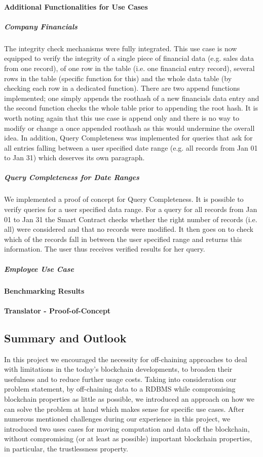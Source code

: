 \paragraph{Additional Functionalities for Use Cases}
\subparagraph{Company Financials}
The integrity check mechanisms were fully integrated. This use case is now equipped to verify the integrity of a single piece of financial data (e.g. sales data from one record), of one row in the table (i.e. one financial entry record), several rows in the table (specific function for this) and the whole data table (by checking each row in a dedicated function).
There are two append functions implemented; one simply appends the roothash of a new financials data entry and the second function checks the whole table prior to appending the root hash. It is worth noting again that this use case is append only and there is no way to modify or change a once appended roothash as this would undermine the overall idea.
In addition, Query Completeness was implemented for queries that ask for all entries falling between a user specified date range (e.g. all records from Jan 01 to Jan 31) which deserves its own paragraph.

\subparagraph{Query Completeness for Date Ranges}
We implemented a proof of concept for Query Completeness. It is possible to verify queries for a user specified data range. For a query for all records from Jan 01 to Jan 31 the Smart Contract checks whether the right number of records (i.e. all) were considered and that no records were modified. It then goes on to check which of the records fall in between the user specified range and returns this information. The user thus receives verified results for her query.

\subparagraph{Employee Use Case}

\paragraph{Benchmarking Results}

\paragraph{Translator - Proof-of-Concept}

\subsection{Summary and Outlook}
In this project we encouraged the necessity for off-chaining approaches to deal with limitations in the today’s blockchain developments, to broaden their usefulness and to reduce further usage costs. Taking into consideration our problem statement, by off-chaining data to a RDBMS while compromising blockchain properties as little as possible, we introduced an approach on how we can solve the problem at hand which makes sense for specific use cases. After numerous mentioned challenges during our experience in this project, we introduced two uses cases for moving computation and data off the blockchain, without compromising (or at least as possible) important blockchain properties, in particular, the trustlessness property.

